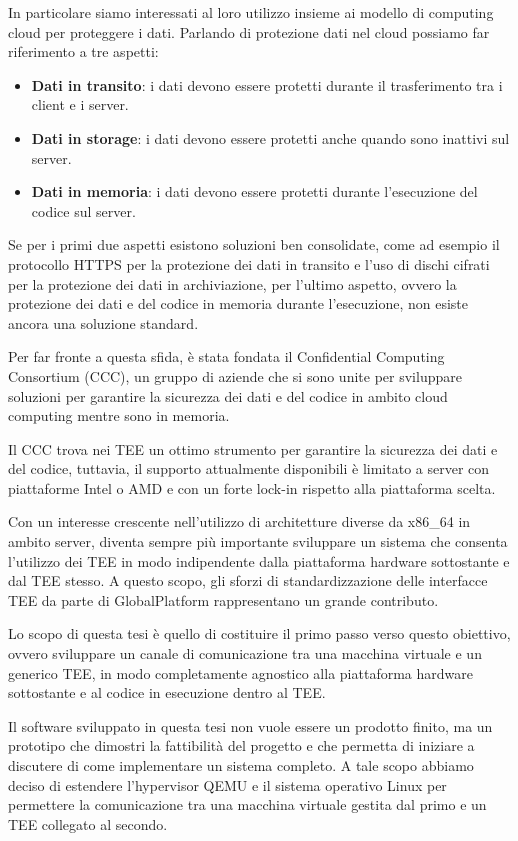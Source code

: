 \documentclass[12pt,italian]{report}
\begin{document}
In particolare siamo interessati al loro utilizzo insieme ai modello di
computing cloud per proteggere i dati.
Parlando di protezione dati nel cloud possiamo far riferimento a tre
aspetti:
\begin{itemize}
    \item \textbf{Dati in transito}: i dati devono essere protetti durante
    il trasferimento tra i client e i server.
    \item \textbf{Dati in storage}: i dati devono essere protetti anche
    quando sono inattivi sul server.
    \item \textbf{Dati in memoria}: i dati devono essere protetti durante
    l'esecuzione del codice sul server.
\end{itemize}

Se per i primi due aspetti esistono soluzioni ben consolidate, come ad
esempio il protocollo HTTPS per la protezione dei dati in transito e
l'uso di dischi cifrati per la protezione dei dati in archiviazione,
per l'ultimo aspetto, ovvero la protezione dei dati e del codice in
memoria durante l'esecuzione, non esiste ancora una soluzione standard.

Per far fronte a questa sfida, è stata fondata il
Confidential Computing Consortium (CCC), un gruppo di aziende che si sono
unite per sviluppare soluzioni per garantire
la sicurezza dei dati e del codice in ambito cloud computing
mentre sono in memoria.

Il CCC trova nei TEE un ottimo strumento per garantire la sicurezza dei dati
e del codice, tuttavia, il supporto attualmente disponibili è
limitato a server con piattaforme Intel o AMD e con un forte lock-in rispetto
alla piattaforma scelta.

Con un interesse crescente nell'utilizzo di architetture diverse da x86\_64
in ambito server, diventa sempre più importante sviluppare un sistema che
consenta l'utilizzo dei TEE in modo indipendente dalla piattaforma
hardware sottostante e dal TEE stesso.
A questo scopo, gli sforzi di standardizzazione delle interfacce TEE da
parte di GlobalPlatform rappresentano un grande contributo.

\bigbreak \noindent

Lo scopo di questa tesi è quello di costituire il primo passo verso questo
obiettivo, ovvero sviluppare un canale di comunicazione tra una macchina
virtuale e un generico TEE, in modo completamente agnostico alla piattaforma
hardware sottostante e al codice in esecuzione dentro al TEE.

Il software sviluppato in questa tesi non vuole essere un prodotto finito,
ma un prototipo che dimostri la fattibilità del progetto e che permetta
di iniziare a discutere di come implementare un sistema completo.
A tale scopo abbiamo deciso di estendere l'hypervisor QEMU e il sistema
operativo Linux per permettere la comunicazione tra una macchina virtuale
gestita dal primo e un TEE collegato al secondo.
\end{document}
